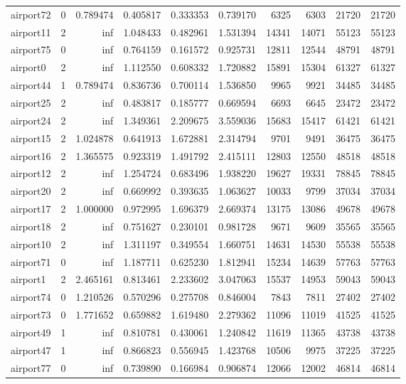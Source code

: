 \begin{longtable}{|l|r|r|r|r|r|r|r|r|r|}
airport72 & 0 & 0.789474 & 0.405817 & 0.333353 & 0.739170 & 6325 & 6303 & 21720 & 21720 \\
airport11 & 2 & inf & 1.048433 & 0.482961 & 1.531394 & 14341 & 14071 & 55123 & 55123 \\
airport75 & 0 & inf & 0.764159 & 0.161572 & 0.925731 & 12811 & 12544 & 48791 & 48791 \\
airport0 & 2 & inf & 1.112550 & 0.608332 & 1.720882 & 15891 & 15304 & 61327 & 61327 \\
airport44 & 1 & 0.789474 & 0.836736 & 0.700114 & 1.536850 & 9965 & 9921 & 34485 & 34485 \\
airport25 & 2 & inf & 0.483817 & 0.185777 & 0.669594 & 6693 & 6645 & 23472 & 23472 \\
airport24 & 2 & inf & 1.349361 & 2.209675 & 3.559036 & 15683 & 15417 & 61421 & 61421 \\
airport15 & 2 & 1.024878 & 0.641913 & 1.672881 & 2.314794 & 9701 & 9491 & 36475 & 36475 \\
airport16 & 2 & 1.365575 & 0.923319 & 1.491792 & 2.415111 & 12803 & 12550 & 48518 & 48518 \\
airport12 & 2 & inf & 1.254724 & 0.683496 & 1.938220 & 19627 & 19331 & 78845 & 78845 \\
airport20 & 2 & inf & 0.669992 & 0.393635 & 1.063627 & 10033 & 9799 & 37034 & 37034 \\
airport17 & 2 & 1.000000 & 0.972995 & 1.696379 & 2.669374 & 13175 & 13086 & 49678 & 49678 \\
airport18 & 2 & inf & 0.751627 & 0.230101 & 0.981728 & 9671 & 9609 & 35565 & 35565 \\
airport10 & 2 & inf & 1.311197 & 0.349554 & 1.660751 & 14631 & 14530 & 55538 & 55538 \\
airport71 & 0 & inf & 1.187711 & 0.625230 & 1.812941 & 15234 & 14639 & 57763 & 57763 \\
airport1 & 2 & 2.465161 & 0.813461 & 2.233602 & 3.047063 & 15537 & 14953 & 59043 & 59043 \\
airport74 & 0 & 1.210526 & 0.570296 & 0.275708 & 0.846004 & 7843 & 7811 & 27402 & 27402 \\
airport73 & 0 & 1.771652 & 0.659882 & 1.619480 & 2.279362 & 11096 & 11019 & 41525 & 41525 \\
airport49 & 1 & inf & 0.810781 & 0.430061 & 1.240842 & 11619 & 11365 & 43738 & 43738 \\
airport47 & 1 & inf & 0.866823 & 0.556945 & 1.423768 & 10506 & 9975 & 37225 & 37225 \\
airport77 & 0 & inf & 0.739890 & 0.166984 & 0.906874 & 12066 & 12002 & 46814 & 46814 \\

\end{longtable}
